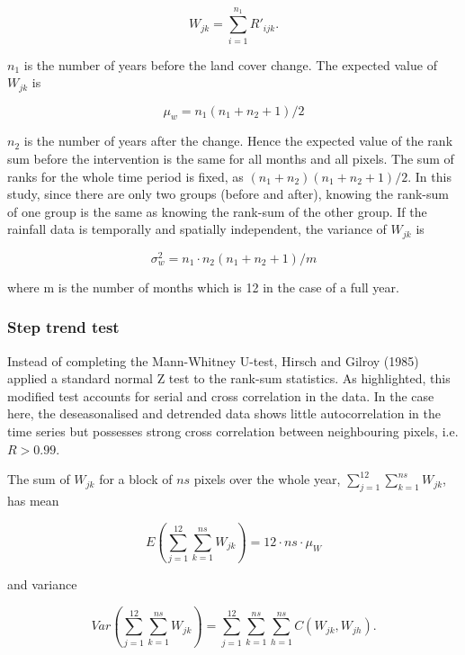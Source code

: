 \documentclass[]{elsarticle} %
\theoremstyle{definition}
\theoremstyle{definition}
\theoremstyle{definition}
\theoremstyle{remark}
\begin{document}
\begin{equation}
  W_{jk} = \sum_{i=1}^{n_1}R'_{ijk}.
  \label{eq:Wj}
\end{equation}

\(n_1\) is the number of years before the land cover change. The
expected value of \(W_{jk}\) is

\begin{equation}
  \mu_w=n_1(n_1+n_2+1)/2
\end{equation}

\(n_2\) is the number of years after the change. Hence the expected
value of the rank sum before the intervention is the same for all months
and all pixels. The sum of ranks for the whole time period is fixed, as
\((n_1+n_2)(n_1+n_2+1)/2\). In this study, since there are only two
groups (before and after), knowing the rank-sum of one group is the same
as knowing the rank-sum of the other group. If the rainfall data is
temporally and spatially independent, the variance of \(W_{jk}\) is

\begin{equation}
  \sigma^2_w = n_1\cdot n_2(n_1+n_2+1)/m
\end{equation}

where m is the number of months which is 12 in the case of a full year.

\subsubsection{Step trend test}\label{step-trend-test-1}

Instead of completing the Mann-Whitney U-test, Hirsch and Gilroy (1985)
applied a standard normal Z test to the rank-sum statistics. As
highlighted, this modified test accounts for serial and cross
correlation in the data. In the case here, the deseasonalised and
detrended data shows little autocorrelation in the time series but
possesses strong cross correlation between neighbouring pixels, i.e.
\(R>0.99\).

The sum of \(W_{jk}\) for a block of \(ns\) pixels over the whole year,
\(\sum_{j=1}^{12}\sum_{k=1}^{ns}W_{jk}\), has mean

\begin{equation}
  E(\sum_{j=1}^{12}\sum_{k=1}^{ns}W_{jk})=12\cdot ns\cdot\mu_W
\end{equation}

and variance

\begin{equation}
  Var(\sum_{j=1}^{12}\sum_{k=1}^{ns}W_{jk})=\sum_{j=1}^{12}\sum_{k=1}^{ns}\sum_{h=1}^{ns}C(W_{jk},W_{jh}).
\end{equation}
\end{document}
